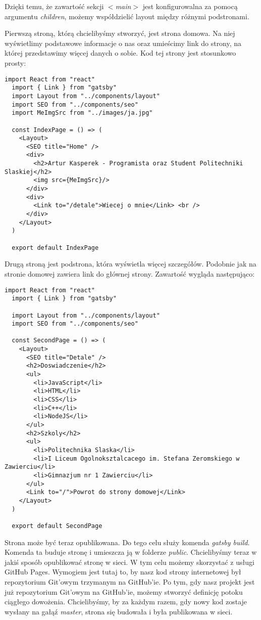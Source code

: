 Dzięki temu, że zawartość sekcji \textit{$<$main$>$} jest konfigurowalna za pomocą argumentu \textit{children}, możemy współdzielić layout między różnymi podstronami.
\par
Pierwszą stroną, którą chcielibyśmy stworzyć, jest strona domowa. Na niej wyświetlimy podstawowe informacje o nas oraz umieścimy link do strony, na której przedstawimy więcej danych o sobie. Kod tej strony jest stosunkowo prosty:
\begin{lstlisting}[caption={index.js - plik zawiera treść strony domowej}]
  import React from "react"
  import { Link } from "gatsby"
  import Layout from "../components/layout"
  import SEO from "../components/seo"
  import MeImgSrc from "../images/ja.jpg"

  const IndexPage = () => (
    <Layout>
      <SEO title="Home" />
      <div>
        <h2>Artur Kasperek - Programista oraz Student Politechniki Slaskiej</h2>
        <img src={MeImgSrc}/>
      </div>
      <div>
        <Link to="/detale">Wiecej o mnie</Link> <br />
      </div>
    </Layout>
  )

  export default IndexPage
\end{lstlisting}
Drugą stroną jest podstrona, która wyświetla więcej szczegółów. Podobnie jak na stronie domowej zawiera link do głównej strony. Zawartość wygląda następująco:
\begin{lstlisting}[caption={detale.js - plik zawiera treść strony z szczegółami}]
  import React from "react"
  import { Link } from "gatsby"

  import Layout from "../components/layout"
  import SEO from "../components/seo"

  const SecondPage = () => (
    <Layout>
      <SEO title="Detale" />
      <h2>Doswiadczenie</h2>
      <ul>
        <li>JavaScript</li>
        <li>HTML</li>
        <li>CSS</li>
        <li>C++</li>
        <li>NodeJS</li>
      </ul>
      <h2>Szkoly</h2>
      <ul>
        <li>Politechnika Slaska</li>
        <li>I Liceum Ogolnoksztalcacego im. Stefana Zeromskiego w Zawierciu</li>
        <li>Gimnazjum nr 1 Zawierciu</li>
      </ul>
      <Link to="/">Powrot do strony domowej</Link>
    </Layout>
  )

  export default SecondPage

\end{lstlisting}
\par
Strona może być teraz opublikowana. Do tego celu służy komenda \textit{gatsby build}. Komenda ta buduje stronę i umieszcza ją w folderze \textit{public}. Chcielibyśmy teraz w jakiś sposób opublikować stronę w sieci. W tym celu możemy skorzystać z usługi GitHub Pages. Wymogiem jest tutaj to, by nasz kod strony internetowej był repozytorium Git'owym trzymanym na GitHub'ie. Po tym, gdy nasz projekt jest już repozytorium Git'owym na GitHub'ie, możemy stworzyć definicję potoku ciągłego dowożenia. Chcielibyśmy, by za każdym razem, gdy nowy kod zostaje wysłany na gałąź \textit{master}, strona się budowała i była publikowana w sieci.
